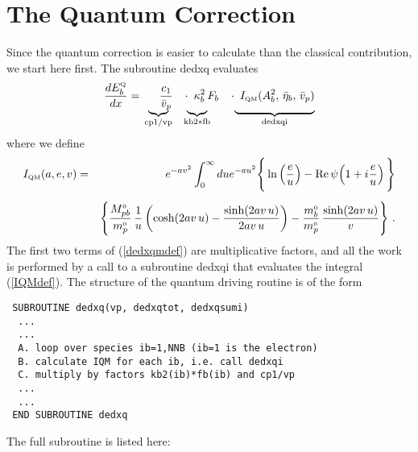 \documentclass[preprint,12pt,eqsecnum,nofootinbib,amsmath,amssymb]{revtex4}
\newcommand{\smQ}{{\rm\scriptscriptstyle Q}}
\newcommand{\smO}{{\rm\scriptscriptstyle 0}}
\newcommand{\smQM}{{\rm\scriptscriptstyle QM}}
\begin{document}
\newpage
\section{The Quantum Correction}

Since the quantum correction is easier to calculate
than the classical contribution, we start here
first. The subroutine dedxq evaluates 
\begin{eqnarray}
\label{dedxqmdef}
  { d E^\smQ_b \over dx} &=&
  \frac{c_1}{\bar v_p} \hskip0.3cm \cdot \hskip0.1cm 
  \kappa_b^2 \, F_b  \hskip0.3cm \cdot \hskip0.1cm 
  I_\smQM(A_b^2, \, \bar\eta_b, \, \bar v_p)
\\[-13pt]\nonumber  &&
  \hskip-0.2cm\underbrace{\hskip0.3cm}_{{\rm cp1/vp}}
  \hskip0.3cm \underbrace{\hskip0.5cm}_{{\rm kb2*fb}}
  \hskip0.7cm \underbrace{\hskip2.5cm}_{{\rm dedxqi}}
\end{eqnarray}
where we define
\begin{eqnarray}
\label{IQMdef}
  I_\smQM(a,e,v)    &=& e^{-a v^2}
  \int_0^\infty du e^{-a u^2}\Bigg\{\ln\left(
  \frac{e}{u}\right) - {\rm Re} \, \psi \hskip-0.05cm 
  \left( 1 + i \frac{e}{u} \right) \Bigg\}
\nonumber\\[5pt]
  && 
  \Bigg\{ 
  {M_{pb}^\smO \over m_p^\smO} \, \frac{1}{u} 
  \left(\cosh(2a v\,u) - {\sinh(2 a v\, u) \over 2 a v\, u} 
  \right)  -
  \frac{m_b^\smO}{m_p^\smO}\, \frac{\sinh(2 a v\, u)}{v} 
  \Bigg\} \ .
\end{eqnarray}
The first two terms of (\ref{dedxqmdef}) are multiplicative 
factors, and all the work is performed by a call to a subroutine
dedxqi that evaluates the integral (\ref{IQMdef}). The structure 
of the quantum driving routine is of the form

{
\baselineskip12pt
\begin{verbatim}
 SUBROUTINE dedxq(vp, dedxqtot, dedxqsumi)
  ...
  ...
  A. loop over species ib=1,NNB (ib=1 is the electron)
  B. calculate IQM for each ib, i.e. call dedxqi
  C. multiply by factors kb2(ib)*fb(ib) and cp1/vp
  ...
  ...
 END SUBROUTINE dedxq
\end{verbatim}
}

\noindent
The full subroutine is listed here:
\end{document}
